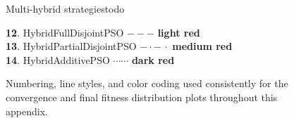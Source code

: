 \begin{figure}[H]
\begin{colorblock}{Multi-hybrid strategies}{todo}
\begin{scriptsize}
\textbf{12}. HybridFullDisjointPSO \quad $- - -$ \colorbox{todolight}{\textbf{light red}} \\
\textbf{13}. HybridPartialDisjointPSO \quad $\mathbf{- \cdot -\, \cdot }$ \colorbox{todomedium}{\textbf{medium red}}\\
\textbf{14}. HybridAdditivePSO \quad $\mathbf{\cdots\cdots }$ \colorbox{tododark}{\textbf{dark red}}\end{scriptsize}
\end{colorblock}
\caption[Plots encoding]{Numbering, line styles, and color coding used consistently for the convergence and final fitness distribution plots throughout this appendix.}
    \label{fig:plot_encoding}
\end{figure}
\vspace{.875em}









